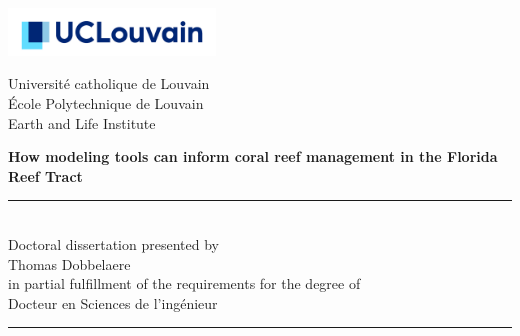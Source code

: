 \thispagestyle{empty}
\begin{minipage}[b]{0.3\textwidth}
\hspace*{-0.8cm}\includegraphics[width=5.5cm]{./figures/logo_ucl.jpg}\vspace{0.85cm}
\end{minipage}
\begin{minipage}[b]{0.69\textwidth}

\begin{center}
\hspace*{0.5cm}Université catholique de Louvain\\
\hspace*{0.5cm}\'Ecole Polytechnique de Louvain\\
\hspace*{0.5cm} Earth and Life Institute\\
\end{center}
\end{minipage}


\vspace*{1.2cm}
\hspace{-0.8cm}
\begin{minipage}{1.02\linewidth}
\centering
\LARGE\bfseries How modeling tools can inform coral reef management in the Florida Reef Tract
\end{minipage}


\vspace*{0.5cm}
\hspace{-0.5cm}\begin{minipage}{\textwidth}
\centering
\rule{50pt}{.5pt}\\[1.2ex]
Doctoral dissertation presented by \\ [2.ex]
{\Large Thomas Dobbelaere\\ [2.ex]
}
in partial fulfillment of the requirements for the degree of\\ [2.ex]
\Large Docteur en Sciences de l'ingénieur

\rule{50pt}{.5pt}\\
\end{minipage}

